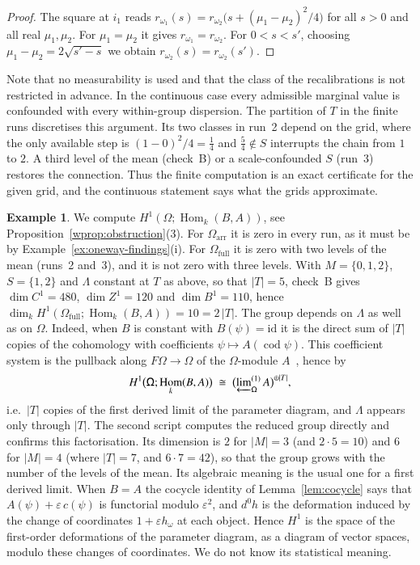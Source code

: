 \documentclass[11pt,a4paper]{article}
\theoremstyle{plain}
\theoremstyle{definition}
\newtheorem{example}[theorem]{Example}
\theoremstyle{remark}
\newcommand{\cat}[1]{\mathsf{#1}}
\newcommand{\catO}{\cat{\Omega}}
\newcommand{\id}{\mathrm{id}}
\DeclareMathOperator{\Hom}{Hom}
\begin{document}
\begin{proof}
The square at $i_1$ reads
$r_{\omega_1}(s) = r_{\omega_2}\bigl(s + (\mu_1-\mu_2)^{2}/4\bigr)$ for all
$s > 0$ and all real $\mu_1,\mu_2$. For $\mu_1 = \mu_2$ it gives
$r_{\omega_1} = r_{\omega_2}$. For $0 < s < s'$, choosing
$\mu_1 - \mu_2 = 2\sqrt{s'-s}$ we obtain
$r_{\omega_2}(s) = r_{\omega_2}(s')$.
\end{proof}

Note that no measurability is used and that the class of the recalibrations is
not restricted in advance. In the continuous case every admissible marginal
value is confounded with every within-group dispersion. The partition of $T$
in the finite runs discretises this argument. Its two classes in
run~2 depend on the grid, where the only available step is
$(1-0)^{2}/4 = \tfrac14$ and $\tfrac54 \notin S$ interrupts the chain from $1$
to $2$. A third level of the mean (check~B) or a scale-confounded $S$ (run~3)
restores the connection. Thus the finite computation is an exact certificate
for the given grid, and the continuous statement says what the grids
approximate.

\begin{example}\label{ex:oneway-h1}
We compute $H^{1}(\catO;\Hom_k(B,A))$, see
Proposition~\ref{wprop:obstruction}(3). For $\catO_{\mathrm{arr}}$ it is zero
in every run, as it must be by
Example~\ref{ex:oneway-findings}(i). For $\catO_{\mathrm{full}}$ it is zero
with two levels of the mean (runs~2 and~3), and it is not zero with three
levels. With $M = \{0,1,2\}$, $S = \{1,2\}$ and $\Lambda$ constant at $T$ as
above, so that $|T| = 5$, check~B gives $\dim C^{1} = 480$,
$\dim Z^{1} = 120$ and $\dim B^{1} = 110$, hence
$\dim_{k} H^{1}(\catO_{\mathrm{full}};\Hom_k(B,A)) = 10 = 2\,|T|$. The group
depends on $\Lambda$ as well as on $\catO$. Indeed, when $B$ is constant with
$B(\psi) = \id$ it is the direct sum of $|T|$ copies of the cohomology with
coefficients $\psi \mapsto A(\operatorname{cod}\psi)$. This coefficient system
is the pullback along $F\catO \to \catO$ of the $\catO$-module
$A$~\cite[(1.18)(2)]{baues_cohomology_1985}, hence
by~\cite[(8.5)(B)]{baues_cohomology_1985}
\[
H^{1}\bigl(\catO;\Hom_k(B,A)\bigr) \;\cong\; \bigl(\varprojlim\nolimits^{(1)}_{\catO} A\bigr)^{\oplus |T|},
\]
i.e.\ $|T|$ copies of the first derived limit of the parameter diagram, and
$\Lambda$ appears only through $|T|$. The second script computes the reduced
group directly and confirms this factorisation. Its dimension is $2$ for
$|M| = 3$ (and $2 \cdot 5 = 10$) and $6$ for $|M| = 4$ (where $|T| = 7$, and
$6 \cdot 7 = 42$), so that the group grows with the number of the levels of
the mean. Its algebraic meaning is the usual one for a first derived limit.
When $B = A$ the cocycle identity of Lemma~\ref{lem:cocycle} says that
$A(\psi) + \varepsilon\, c(\psi)$ is functorial modulo $\varepsilon^{2}$, and
$d^{0}h$ is the deformation induced by the change of coordinates
$1 + \varepsilon h_\omega$ at each object. Hence $H^{1}$ is the space of the
first-order deformations of the parameter diagram, as a diagram of vector
spaces, modulo these changes of coordinates. We do not know its statistical
meaning.
\end{example}
\end{document}

